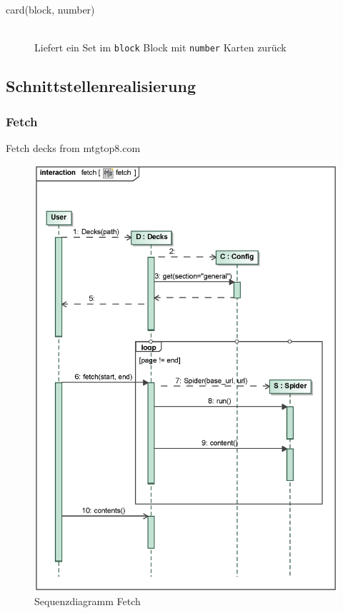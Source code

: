 \begin{description}
    \item[card(block, number)] \hfill \\
    Liefert ein Set im \verb|block| Block mit \verb|number| Karten zurück
\end{description}


\subsection{Schnittstellenrealisierung}
%
%
\subsubsection{Fetch} %
Fetch decks from mtgtop8.com \cite{mtgtop8} %

\begin{figure}[H]
    \myfloatalign
    \includegraphics[width=\textwidth]{gfx/MtGDeepAnalysis/fetch.eps}
    \caption{Sequenzdiagramm Fetch} %
    \label{fig:seq:fetch}
\end{figure}

